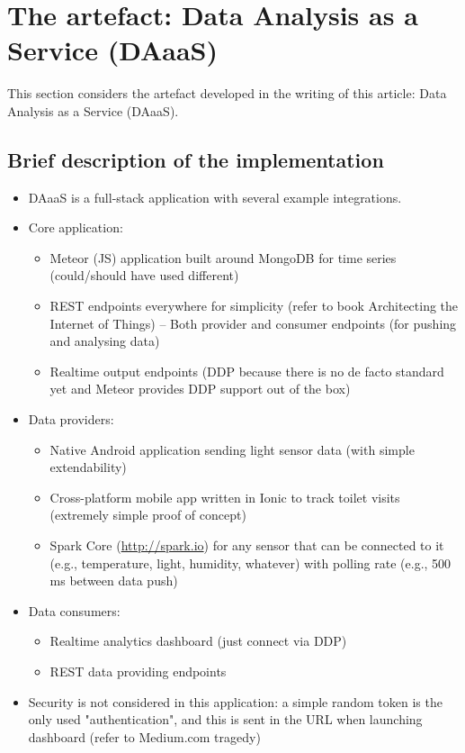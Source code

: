 \section{The artefact: Data Analysis as a Service (DAaaS)}
This section considers the artefact developed in the writing of this article: Data Analysis as a Service (DAaaS).
\subsection{Brief description of the implementation}
\begin{itemize}
    \item DAaaS is a full-stack application with several example integrations.
    \item Core application:
    \begin{itemize}
        \item Meteor (JS) application built around MongoDB for time series (could/should have used different)
        \item REST endpoints everywhere for simplicity (refer to book Architecting the Internet of Things) – Both provider and consumer endpoints (for pushing and analysing data)
        \item Realtime output endpoints (DDP because there is no de facto standard yet and Meteor provides DDP support out of the box)
    \end{itemize}
    \item Data providers:
    \begin{itemize}
        \item Native Android application sending light sensor data (with simple extendability)
        \item Cross-platform mobile app written in Ionic to track toilet visits (extremely simple proof of concept)
        \item Spark Core (\url{http://spark.io}) for any sensor that can be connected to it (e.g., temperature, light, humidity, whatever) with polling rate (e.g., 500 ms between data push)
    \end{itemize}
    \item Data consumers:
    \begin{itemize}
        \item Realtime analytics dashboard (just connect via DDP)
        \item REST data providing endpoints
    \end{itemize}
    \item Security is not considered in this application: a simple random token is the only used "authentication", and this is sent in the URL when launching dashboard (refer to Medium.com tragedy)
\end{itemize}

